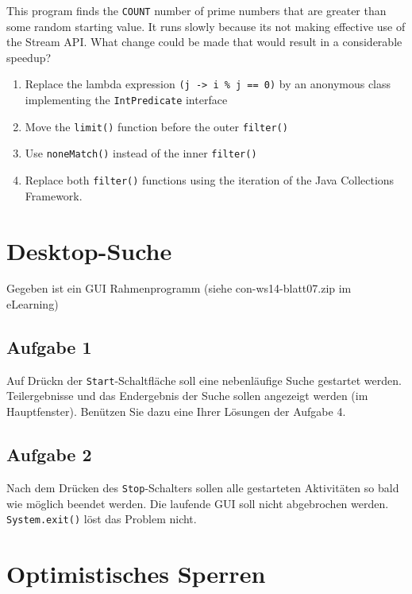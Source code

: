This program finds the \texttt{COUNT} number of prime numbers that are
greater than some random starting value. It runs slowly because its not
making effective use of the Stream API. What change could be made that
would result in a considerable speedup?

\begin{enumerate}
\def\labelenumi{\arabic{enumi}.}
\tightlist
\item
  Replace the lambda expression
  \texttt{(j\ -\textgreater{}\ i\ \%\ j\ ==\ 0)} by an anonymous class
  implementing the \texttt{IntPredicate} interface
\item
  Move the \texttt{limit()} function before the outer \texttt{filter()}
\item
  Use \texttt{noneMatch()} instead of the inner \texttt{filter()}
\item
  Replace both \texttt{filter()} functions using the iteration of the
  Java Collections Framework.
\end{enumerate}

\section{Desktop-Suche}\label{desktop-suche}

Gegeben ist ein GUI Rahmenprogramm (siehe con-ws14-blatt07.zip im
eLearning)

\subsection{Aufgabe 1}\label{aufgabe-1-1}

Auf Drückn der \texttt{Start}-Schaltfläche soll eine nebenläufige Suche
gestartet werden. Teilergebnisse und das Endergebnis der Suche sollen
angezeigt werden (im Hauptfenster). Benützen Sie dazu eine Ihrer
Lösungen der Aufgabe 4.

\subsection{Aufgabe 2}\label{aufgabe-2-1}

Nach dem Drücken des \texttt{Stop}-Schalters sollen alle gestarteten
Aktivitäten so bald wie möglich beendet werden. Die laufende GUI soll
nicht abgebrochen werden. \texttt{System.exit()} löst das Problem nicht.

\section{Optimistisches Sperren}\label{optimistisches-sperren}

